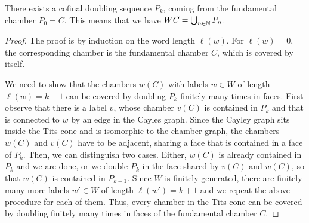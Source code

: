 \begin{theorem}\label{thm:cofinal}
    There exists a cofinal doubling sequence \(P_k\), coming from the fundamental chamber \(P_0 = C\).
    This means that we have \(WC = \bigcup_{n \in \mathbb{N}} P_n\).
\end{theorem}
\begin{proof}
    The proof is by induction on the word length \(\ell(w)\).
    For \(\ell(w) = 0\), the corresponding chamber is the fundamental chamber \(C\), which is covered by itself.
    \par\noindent
    We need to show that the chambers \(w(C)\) with labels \(w \in W\) of length \(\ell(w) = k + 1\) can be covered by doubling \(P_k\) finitely many times in faces.
    First observe that there is a label \(v\), whose chamber \(v(C)\) is contained in \(P_k\) and that is connected to \(w\) by an edge in the Cayles graph.
    Since the Cayley graph sits inside the Tits cone and is isomorphic to the chamber graph, the chambers \(w(C)\) and \(v(C)\) have to be adjacent, sharing a face that is contained in a face of \(P_k\).
    Then, we can distinguish two cases.
    Either, \(w(C)\) is already contained in \(P_k\) and we are done, or we double \(P_k\) in the face shared by \(v(C)\) and \(w(C)\), so that \(w(C)\) is contained in \(P_{k+1}\).
    Since \(W\) is finitely generated, there are finitely many more labels \(w' \in W\) of length \(\ell(w') = k + 1\) and we repeat the above procedure for each of them.
    Thus, every chamber in the Tits cone can be covered by doubling finitely many times in faces of the fundamental chamber \(C\).
\end{proof}

